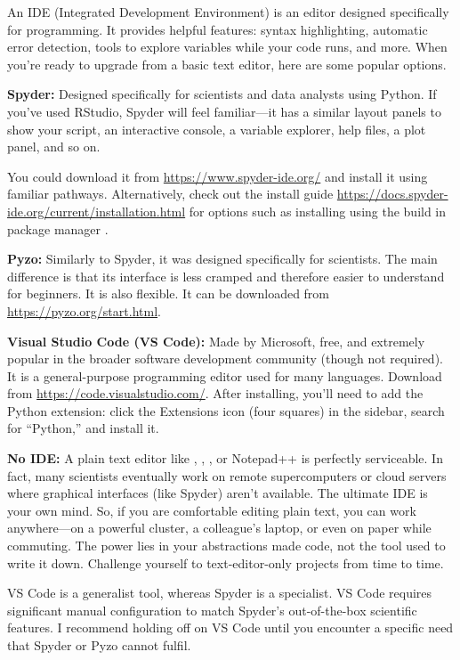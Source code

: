 An IDE (Integrated Development Environment) is an editor designed specifically for programming. It provides helpful features: syntax highlighting, automatic error detection, tools to explore variables while your code runs, and more. When you're ready to upgrade from a basic text editor, here are some popular options.

\textbf{Spyder:} Designed specifically for scientists and data analysts using Python. If you've used RStudio, Spyder will feel familiar---it has a similar layout panels to show your script, an interactive console, a variable explorer, help files, a plot panel, and so on.

You could download it from \url{https://www.spyder-ide.org/} and install it using familiar pathways. Alternatively, check out the install guide \url{https://docs.spyder-ide.org/current/installation.html} for options such as installing using the build in package manager .

\textbf{Pyzo:} Similarly to Spyder, it was designed specifically for scientists. The main difference is that its interface is less cramped and therefore easier to understand for beginners. It is also flexible. It can be downloaded from \url{https://pyzo.org/start.html}.

\textbf{Visual Studio Code (VS Code):} Made by Microsoft, free, and extremely popular in the broader software development community (though not required). It is a general-purpose programming editor used for many languages. Download from \url{https://code.visualstudio.com/}. After installing, you'll need to add the Python extension: click the Extensions icon (four squares) in the sidebar, search for ``Python,'' and install it.

\textbf{No IDE:} A plain text editor like , , , or Notepad++ is perfectly serviceable. In fact, many scientists eventually work on remote supercomputers or cloud servers where graphical interfaces (like Spyder) aren't available. The ultimate IDE is your own mind. So, if you are comfortable editing plain text, you can work anywhere---on a powerful cluster, a colleague's laptop, or even on paper while commuting. The power lies in your abstractions made code, not the tool used to write it down. Challenge yourself to text-editor-only projects from time to time.

\begin{note}
VS Code is a generalist tool, whereas Spyder is a specialist. VS Code requires significant manual configuration to match Spyder's out-of-the-box scientific features. I recommend holding off on VS Code until you encounter a specific need that Spyder or Pyzo cannot fulfil.
\end{note}

